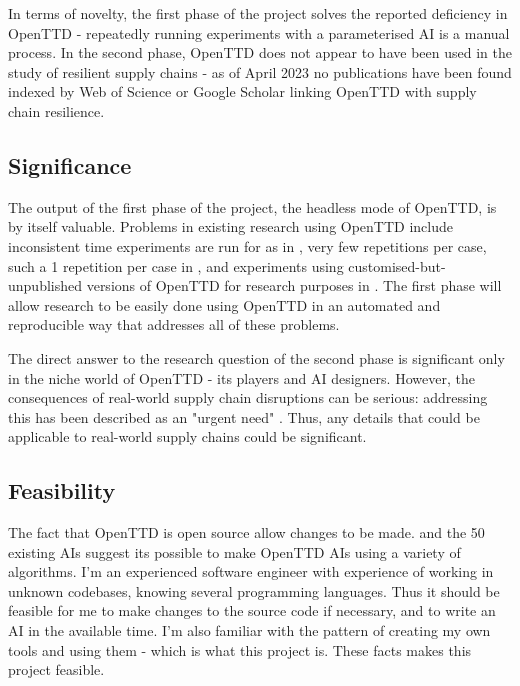 \documentclass[a4paper,11pt]{article}
\begin{document}
In terms of novelty, the first phase of the project solves the reported \cite{openttdNoHeadless} deficiency in OpenTTD - repeatedly running experiments with a parameterised AI is a manual process. In the second phase, OpenTTD does not appear to have been used in the study of resilient supply chains - as of April 2023 no publications have been found indexed by Web of Science or Google Scholar linking OpenTTD with supply chain resilience.

\subsection{Significance}

The output of the first phase of the project, the headless mode of OpenTTD, is by itself valuable. Problems in existing research using OpenTTD include inconsistent time experiments are run for as in \cite{rios_trains_2009}, very few repetitions per case, such a 1 repetition per case in \cite{wisniewski_artificial}, and experiments using customised-but-unpublished versions of OpenTTD for research purposes in \cite{shen_rtsenv_2011, konijnendijk2015mcts}. The first phase will allow research to be easily done using OpenTTD in an automated and reproducible way that addresses all of these problems. 

The direct answer to the research question of the second phase is significant only in the  niche world of OpenTTD - its players and AI designers. However, the consequences of real-world supply chain disruptions can be serious: addressing this has been described as an "urgent need" \cite{moosavi_supply_2022}. Thus, any details that could be applicable to real-world supply chains could be significant.


\subsection{Feasibility}

The fact that OpenTTD is open source allow changes to be made. and the 50 existing AIs suggest its possible to make OpenTTD AIs using a variety of algorithms. I'm an experienced software engineer with experience of working in unknown codebases, knowing several programming languages. Thus it should be feasible for me to make changes to the source code if necessary, and to write an AI in the available time. I'm also familiar with the pattern of creating my own tools and using them - which is what this project is. These facts makes this project feasible.
\end{document}
